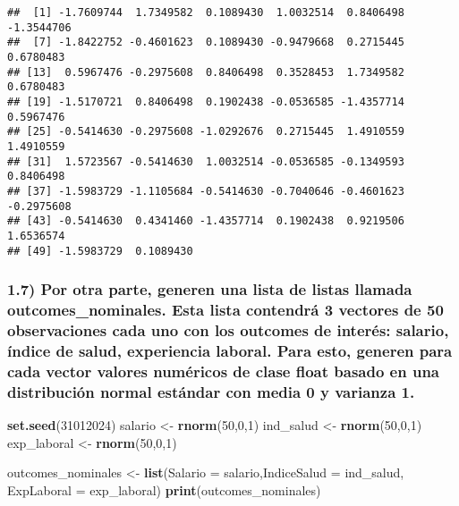 \documentclass[
]{article}
\newenvironment{Shaded}{\begin{snugshade}}{\end{snugshade}}
\newcommand{\AttributeTok}[1]{\textcolor[rgb]{0.13,0.29,0.53}{#1}}
\newcommand{\DecValTok}[1]{\textcolor[rgb]{0.00,0.00,0.81}{#1}}
\newcommand{\FunctionTok}[1]{\textcolor[rgb]{0.13,0.29,0.53}{\textbf{#1}}}
\newcommand{\NormalTok}[1]{#1}
\newcommand{\OtherTok}[1]{\textcolor[rgb]{0.56,0.35,0.01}{#1}}
\begin{document}
\begin{verbatim}
##  [1] -1.7609744  1.7349582  0.1089430  1.0032514  0.8406498 -1.3544706
##  [7] -1.8422752 -0.4601623  0.1089430 -0.9479668  0.2715445  0.6780483
## [13]  0.5967476 -0.2975608  0.8406498  0.3528453  1.7349582  0.6780483
## [19] -1.5170721  0.8406498  0.1902438 -0.0536585 -1.4357714  0.5967476
## [25] -0.5414630 -0.2975608 -1.0292676  0.2715445  1.4910559  1.4910559
## [31]  1.5723567 -0.5414630  1.0032514 -0.0536585 -0.1349593  0.8406498
## [37] -1.5983729 -1.1105684 -0.5414630 -0.7040646 -0.4601623 -0.2975608
## [43] -0.5414630  0.4341460 -1.4357714  0.1902438  0.9219506  1.6536574
## [49] -1.5983729  0.1089430
\end{verbatim}

\hypertarget{por-otra-parte-generen-una-lista-de-listas-llamada-outcomes_nominales.-esta-lista-contendruxe1-3-vectores-de-50-observaciones-cada-uno-con-los-outcomes-de-interuxe9s-salario-uxedndice-de-salud-experiencia-laboral.-para-esto-generen-para-cada-vector-valores-numuxe9ricos-de-clase-float-basado-en-una-distribuciuxf3n-normal-estuxe1ndar-con-media-0-y-varianza-1.}{%
\subsubsection{1.7) Por otra parte, generen una lista de listas llamada
outcomes\_nominales. Esta lista contendrá 3 vectores de 50 observaciones
cada uno con los outcomes de interés: salario, índice de salud,
experiencia laboral. Para esto, generen para cada vector valores
numéricos de clase float basado en una distribución normal estándar con
media 0 y varianza
1.}\label{por-otra-parte-generen-una-lista-de-listas-llamada-outcomes_nominales.-esta-lista-contendruxe1-3-vectores-de-50-observaciones-cada-uno-con-los-outcomes-de-interuxe9s-salario-uxedndice-de-salud-experiencia-laboral.-para-esto-generen-para-cada-vector-valores-numuxe9ricos-de-clase-float-basado-en-una-distribuciuxf3n-normal-estuxe1ndar-con-media-0-y-varianza-1.}}

\begin{Shaded}
\begin{Highlighting}[]
\FunctionTok{set.seed}\NormalTok{(}\DecValTok{31012024}\NormalTok{)}
\NormalTok{salario }\OtherTok{\textless{}{-}} \FunctionTok{rnorm}\NormalTok{(}\DecValTok{50}\NormalTok{,}\DecValTok{0}\NormalTok{,}\DecValTok{1}\NormalTok{)}
\NormalTok{ind\_salud }\OtherTok{\textless{}{-}} \FunctionTok{rnorm}\NormalTok{(}\DecValTok{50}\NormalTok{,}\DecValTok{0}\NormalTok{,}\DecValTok{1}\NormalTok{)}
\NormalTok{exp\_laboral }\OtherTok{\textless{}{-}} \FunctionTok{rnorm}\NormalTok{(}\DecValTok{50}\NormalTok{,}\DecValTok{0}\NormalTok{,}\DecValTok{1}\NormalTok{)}

\NormalTok{outcomes\_nominales }\OtherTok{\textless{}{-}} \FunctionTok{list}\NormalTok{(}\AttributeTok{Salario =}\NormalTok{ salario,}\AttributeTok{IndiceSalud =}\NormalTok{ ind\_salud, }\AttributeTok{ExpLaboral =}\NormalTok{ exp\_laboral)}
\FunctionTok{print}\NormalTok{(outcomes\_nominales)}
\end{Highlighting}
\end{Shaded}
\end{document}
